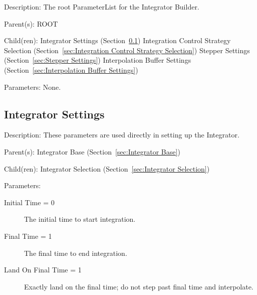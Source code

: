 \begin{list}{}
  {\setlength{\leftmargin}{1.0in}
   \setlength{\labelwidth}{0.75in}
   \setlength{\labelsep}{0.125in}}
  \item[Description:]
    The root ParameterList for the Integrator Builder.
  \item[Parent(s):]
   ROOT 
  \item[Child(ren):]
    Integrator Settings (Section~\ref{sec:Integrator Settings})
      \newline 
    Integration Control Strategy Selection (Section~\ref{sec:Integration Control Strategy Selection})
      \newline 
    Stepper Settings (Section~\ref{sec:Stepper Settings})
      \newline 
    Interpolation Buffer Settings (Section~\ref{sec:Interpolation Buffer Settings})
  \item[Parameters:]
    None. 
\end{list}

\subsection{Integrator Settings}
\label{sec:Integrator Settings}

\begin{list}{}
  {\setlength{\leftmargin}{1.0in}
   \setlength{\labelwidth}{0.75in}
   \setlength{\labelsep}{0.125in}}
  \item[Description:]
    These parameters are used directly in setting up the Integrator.
  \item[Parent(s):]
    Integrator Base (Section~\ref{sec:Integrator Base})
  \item[Child(ren):]
    Integrator Selection (Section~\ref{sec:Integrator Selection})
  \item[Parameters:]
    \begin{description}
      \item[Initial Time = 0] 
The initial time to start integration.
      \item[Final Time = 1] 
The final time to end integration.
      \item[Land On Final Time = 1] 
Exactly land on the final time; do not step past final time and interpolate.
\end{description}

\end{list}


